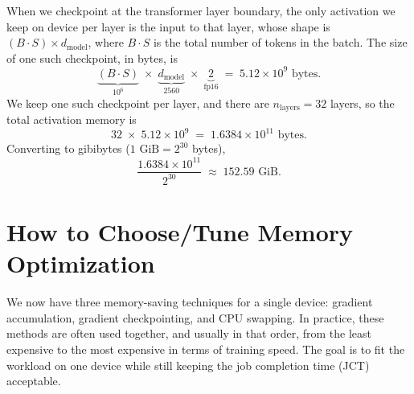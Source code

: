 When we checkpoint at the transformer layer boundary, the only activation we keep on device per layer is the input to that layer, whose shape is $(B \cdot S) \times d_{\text{model}}$, where $B \cdot S$ is the total number of tokens in the batch. The size of one such checkpoint, in bytes, is
\[
\underbrace{(B \cdot S)}_{10^6} \;\times\; \underbrace{d_{\text{model}}}_{2560} \;\times\; \underbrace{2}_{\text{fp16}} \;=\; 5.12 \times 10^9 \text{ bytes}.
\]
We keep one such checkpoint per layer, and there are $n_{\text{layers}} = 32$ layers, so the total activation memory is
\[
32 \;\times\; 5.12 \times 10^9 \;=\; 1.6384 \times 10^{11} \text{ bytes}.
\]
Converting to gibibytes ($1\text{ GiB} = 2^{30}$ bytes),
\[
\frac{1.6384 \times 10^{11}}{2^{30}} \;\approx\; 152.59 \text{ GiB}.
\]

\section{How to Choose/Tune Memory Optimization}

We now have three memory-saving techniques for a single device: gradient accumulation, gradient checkpointing, and CPU swapping. In practice, these methods are often used together, and usually in that order, from the least expensive to the most expensive in terms of training speed. The goal is to fit the workload on one device while still keeping the job completion time (JCT) acceptable.

